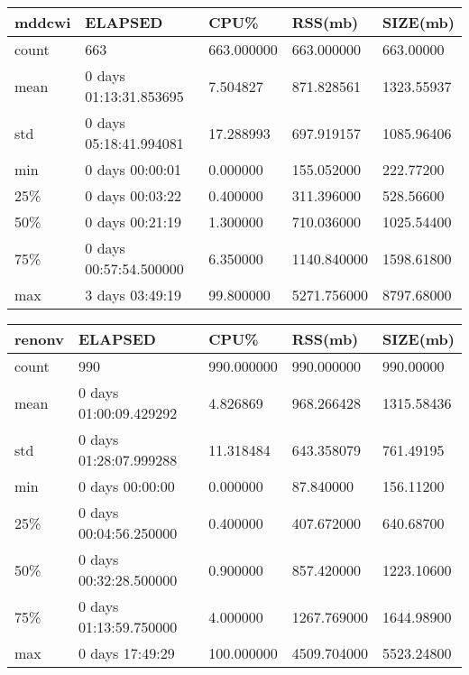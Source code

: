 \documentclass{article}
\begin{document}
\begin{table}[H]
\begin{tabular}{|l|l|l|l|l|}
\hline mddcwi& ELAPSED&   CPU\%&  RSS(mb)&   SIZE(mb) \\
\hline count&    663& 663.000000&  663.000000&  663.00000 \\
\hline mean&  0 days 01:13:31.853695&  7.504827&  871.828561& 1323.55937 \\
\hline std&  0 days 05:18:41.994081&  17.288993&  697.919157& 1085.96406 \\
\hline min&   0 days 00:00:01&  0.000000&  155.052000&  222.77200 \\
\hline 25\%&   0 days 00:03:22&  0.400000&  311.396000&  528.56600 \\
\hline 50\%&   0 days 00:21:19&  1.300000&  710.036000& 1025.54400 \\
\hline 75\%&  0 days 00:57:54.500000&  6.350000& 1140.840000& 1598.61800 \\
\hline max&   3 days 03:49:19&  99.800000& 5271.756000& 8797.68000 \\
\hline 
\end{tabular}
\label{TABLE-SessionSizemddcwi}
\end{table}

\begin{table}[H]
\begin{tabular}{|l|l|l|l|l|}
\hline renonv& ELAPSED&   CPU\%&  RSS(mb)&   SIZE(mb) \\
\hline count&    990& 990.000000&  990.000000&  990.00000 \\
\hline mean&  0 days 01:00:09.429292&  4.826869&  968.266428& 1315.58436 \\
\hline std&  0 days 01:28:07.999288&  11.318484&  643.358079&  761.49195 \\
\hline min&   0 days 00:00:00&  0.000000&  87.840000&  156.11200 \\
\hline 25\%&  0 days 00:04:56.250000&  0.400000&  407.672000&  640.68700 \\
\hline 50\%&  0 days 00:32:28.500000&  0.900000&  857.420000& 1223.10600 \\
\hline 75\%&  0 days 01:13:59.750000&  4.000000& 1267.769000& 1644.98900 \\
\hline max&   0 days 17:49:29& 100.000000& 4509.704000& 5523.24800 \\
\hline 
\end{tabular}
\label{TABLE-SessionSizerenonv}
\end{table}
\end{document}
